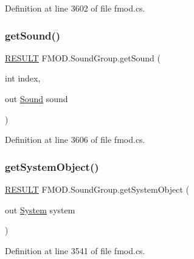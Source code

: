 Definition at line 3602 of file fmod.\+cs.

\mbox{\label{class_f_m_o_d_1_1_sound_group_a1e42f0b0d90d30f70fc751367ca0b6e2}} 
\subsubsection{\texorpdfstring{get\+Sound()}{getSound()}}
{\footnotesize\ttfamily \hyperlink{namespace_f_m_o_d_a305d1176ef3f8c8815861a60407ac33d}{R\+E\+S\+U\+LT} F\+M\+O\+D.\+Sound\+Group.\+get\+Sound (\begin{DoxyParamCaption}\item[{int}]{index,  }\item[{out \hyperlink{class_f_m_o_d_1_1_sound}{Sound}}]{sound }\end{DoxyParamCaption})}



Definition at line 3606 of file fmod.\+cs.

\mbox{\label{class_f_m_o_d_1_1_sound_group_adc184d4f394931e221aab789388d87e5}} 
\subsubsection{\texorpdfstring{get\+System\+Object()}{getSystemObject()}}
{\footnotesize\ttfamily \hyperlink{namespace_f_m_o_d_a305d1176ef3f8c8815861a60407ac33d}{R\+E\+S\+U\+LT} F\+M\+O\+D.\+Sound\+Group.\+get\+System\+Object (\begin{DoxyParamCaption}\item[{out \hyperlink{class_f_m_o_d_1_1_system}{System}}]{system }\end{DoxyParamCaption})}



Definition at line 3541 of file fmod.\+cs.

\mbox{\label{class_f_m_o_d_1_1_sound_group_ae5e45ff7f79cac2160adbc630188712c}} 
